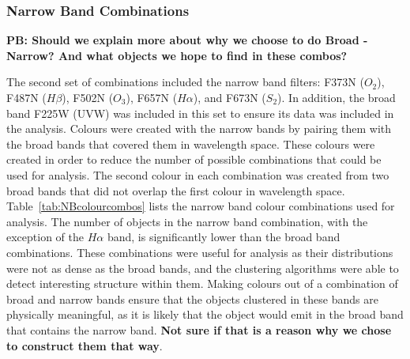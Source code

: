 \subsubsection{Narrow Band Combinations}

\textbf{PB: Should we explain more about why we choose to do Broad - Narrow? And what objects we hope to find in these combos?}

The second set of combinations included the narrow band filters: F373N ($O_{2}$), F487N ($H\beta$), F502N ($O_{3}$), F657N ($H\alpha$), and F673N ($S_{2}$).
In addition, the broad band F225W (UVW) was included in this set to ensure its data was included in the analysis. 
Colours were created with the narrow bands by pairing them with the broad bands that covered them in wavelength space.
These colours were created in order to reduce the number of possible combinations that could be used for analysis.
The second colour in each combination was created from two broad bands that did not overlap the first colour in wavelength space.
Table~\ref{tab:NBcolourcombos} lists the narrow band colour combinations used for analysis.
The number of objects in the narrow band combination, with the exception of the $H\alpha$ band, is significantly lower than the broad band combinations.
These combinations were useful for analysis as their distributions were not as dense as the broad bands, and the clustering algorithms were able to detect interesting structure within them.
Making colours out of a combination of broad and narrow bands ensure that the objects clustered in these bands are physically meaningful, as it is likely that the object would emit in the broad band that contains the narrow band. \textbf{Not sure if that is a reason why we chose to construct them that way}.

